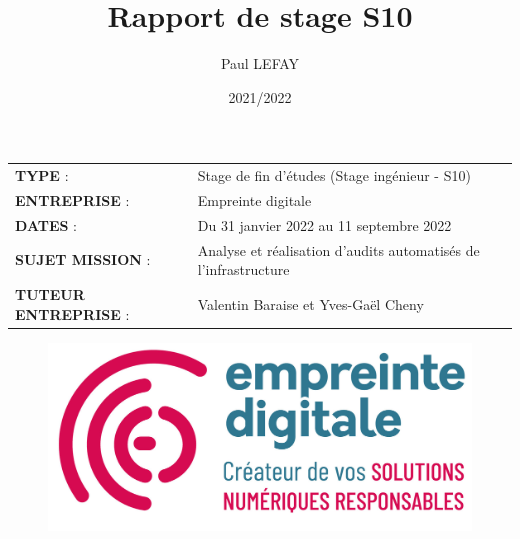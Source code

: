 \documentclass[12pt]{article}
\title{Rapport de stage S10}
\author{Paul LEFAY}
\date{2021/2022}
\begin{document}
\cfoot{\thepage}

\renewcommand{\headrulewidth}{0.4pt}
\renewcommand{\footrulewidth}{0.4pt}
\renewcommand{\contentsname}{Table des matières}
\renewcommand{\listfigurename}{}
\renewcommand{\listtablename}{}
\renewcommand{\thebibliography}{}
\renewcommand{\glossarysection}[2][]{}

\maketitle
\thispagestyle{empty}
\begin{center}
	\begin{tabular}{ m{5cm} m{11.5cm} }
	\textbf{TYPE} : & \mbox{\ooalign{$\checkmark$\cr\hidewidth$\square$\hidewidth\cr}}  Stage de fin d'études (Stage ingénieur - S10) \\
   \textbf{ENTREPRISE} :  & Empreinte digitale \\
   \textbf{DATES} : & Du 31 janvier 2022 au 11 septembre 2022 \\
   \textbf{SUJET MISSION} : & Analyse et réalisation d'audits automatisés de l'infrastructure \\
   \textbf{TUTEUR ENTREPRISE} :  & Valentin Baraise et Yves-Gaël Cheny \\
 \end{tabular}
\end{center}

\begin{figure}[!ht]
    \centering
    \includegraphics[scale=0.8]{src/ed_logo.png}
    \label{fig:ed_logo}
\end{figure}
\end{document}
